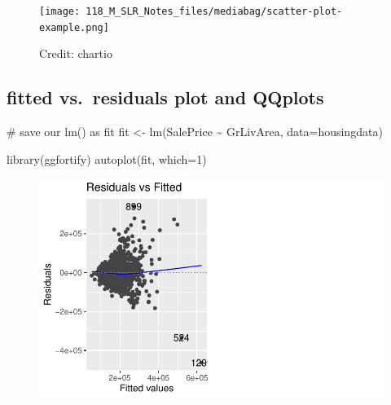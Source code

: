\documentclass[
  letterpaper,
  DIV=11,
  numbers=noendperiod]{scrartcl}
\newenvironment{Shaded}{\begin{snugshade}}{\end{snugshade}}
\newcommand{\AttributeTok}[1]{\textcolor[rgb]{0.40,0.45,0.13}{#1}}
\newcommand{\CommentTok}[1]{\textcolor[rgb]{0.37,0.37,0.37}{#1}}
\newcommand{\DecValTok}[1]{\textcolor[rgb]{0.68,0.00,0.00}{#1}}
\newcommand{\FunctionTok}[1]{\textcolor[rgb]{0.28,0.35,0.67}{#1}}
\newcommand{\NormalTok}[1]{\textcolor[rgb]{0.00,0.23,0.31}{#1}}
\newcommand{\OtherTok}[1]{\textcolor[rgb]{0.00,0.23,0.31}{#1}}
\newcommand{\SpecialCharTok}[1]{\textcolor[rgb]{0.37,0.37,0.37}{#1}}
\begin{document}
\begin{figure}

{\centering \texttt{[image: 118\_M\_SLR\_Notes\_files/mediabag/scatter-plot-example.png]}

}

\caption{Credit: chartio}

\end{figure}

\hypertarget{fitted-vs.-residuals-plot-and-qqplots}{%
\subsection{fitted vs.~residuals plot and
QQplots}\label{fitted-vs.-residuals-plot-and-qqplots}}

\begin{Shaded}
\begin{Highlighting}[]
\CommentTok{\# save our lm() as fit}
\NormalTok{fit }\OtherTok{\textless{}{-}} \FunctionTok{lm}\NormalTok{(SalePrice }\SpecialCharTok{\textasciitilde{}}\NormalTok{ GrLivArea, }\AttributeTok{data=}\NormalTok{housingdata)}
\end{Highlighting}
\end{Shaded}

\begin{Shaded}
\begin{Highlighting}[]
\FunctionTok{library}\NormalTok{(ggfortify)}
\FunctionTok{autoplot}\NormalTok{(fit, }\AttributeTok{which=}\DecValTok{1}\NormalTok{)}
\end{Highlighting}
\end{Shaded}

\begin{figure}[H]

{\centering \includegraphics{118_M_SLR_Notes_files/figure-pdf/unnamed-chunk-8-1.pdf}

}

\end{figure}
\end{document}
